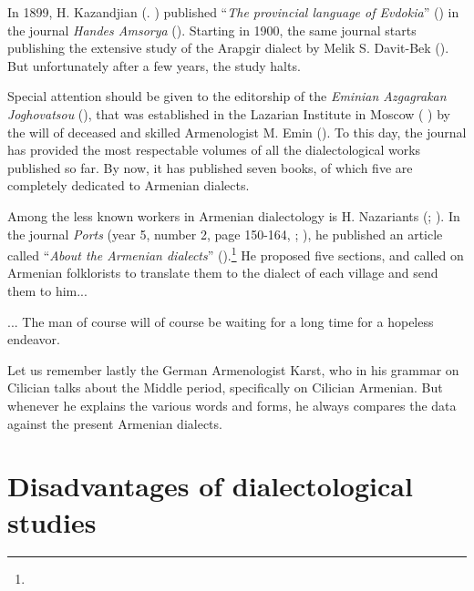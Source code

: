 In 1899, H. Kazandjian (. \citealt{KazandjianBook}) published ``\textit{The provincial language of Evdokia}'' () in the journal \textit{Handes Amsorya} (). Starting in 1900, the same journal starts publishing the extensive study of the Arapgir dialect by Melik S. Davit-Bek (). But unfortunately after a few years, the study halts. 

Special attention should be given to the editorship of the \textit{Eminian Azgagrakan Joghovatsou} (), that was established in the Lazarian Institute in Moscow ( ) by the will of deceased and skilled Armenologist M. Emin (). To this day, the journal has provided the most respectable volumes of all the dialectological works published so far. By now, it has published seven books, of which five are completely dedicated to Armenian dialects. 

Among the less known workers in Armenian dialectology is H. Nazariants (; ). In the journal \textit{Ports} (year 5, number 2, page 150-164, ; ), he published an article called ``\textit{About the Armenian dialects}'' ().\footnote{} He proposed five sections, and called on Armenian folklorists to translate them to the dialect of each village and send them to him... 

\begin{adjarianpage}\label{page:4}\end{adjarianpage}%

... The man of course will of course be waiting for a long time for a hopeless endeavor. 

Let us remember lastly the German Armenologist Karst, who in his grammar on Cilician \citep{Karst-1901-MiddleArmenain} talks about the Middle period, specifically on Cilician Armenian. But whenever he explains the various words and forms, he always compares the data against the present Armenian dialects. 

\section{Disadvantages of dialectological studies}

